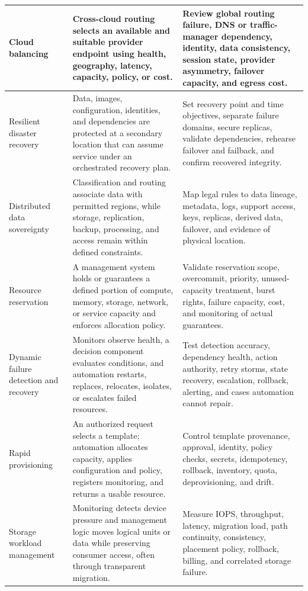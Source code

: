 \documentclass[11pt]{article}
\begin{document}
\begin{longtable}{@{}>{\RaggedRight\arraybackslash}p{}>{\RaggedRight\arraybackslash}p{}>{\RaggedRight\arraybackslash}p{}@{}}
Cloud balancing & Cross-cloud routing selects an available and suitable provider endpoint using health, geography, latency, capacity, policy, or cost. & Review global routing failure, DNS or traffic-manager dependency, identity, data consistency, session state, provider asymmetry, failover capacity, and egress cost. \\\midrule
Resilient disaster recovery & Data, images, configuration, identities, and dependencies are protected at a secondary location that can assume service under an orchestrated recovery plan. & Set recovery point and time objectives, separate failure domains, secure replicas, validate dependencies, rehearse failover and failback, and confirm recovered integrity. \\\midrule
Distributed data sovereignty & Classification and routing associate data with permitted regions, while storage, replication, backup, processing, and access remain within defined constraints. & Map legal rules to data lineage, metadata, logs, support access, keys, replicas, derived data, failover, and evidence of physical location. \\\midrule
Resource reservation & A management system holds or guarantees a defined portion of compute, memory, storage, network, or service capacity and enforces allocation policy. & Validate reservation scope, overcommit, priority, unused-capacity treatment, burst rights, failure capacity, cost, and monitoring of actual guarantees. \\\midrule
Dynamic failure detection and recovery & Monitors observe health, a decision component evaluates conditions, and automation restarts, replaces, relocates, isolates, or escalates failed resources. & Test detection accuracy, dependency health, action authority, retry storms, state recovery, escalation, rollback, alerting, and cases automation cannot repair. \\\midrule
Rapid provisioning & An authorized request selects a template; automation allocates capacity, applies configuration and policy, registers monitoring, and returns a usable resource. & Control template provenance, approval, identity, policy checks, secrets, idempotency, rollback, inventory, quota, deprovisioning, and drift. \\\midrule
Storage workload management & Monitoring detects device pressure and management logic moves logical units or data while preserving consumer access, often through transparent migration. & Measure IOPS, throughput, latency, migration load, path continuity, consistency, placement policy, rollback, billing, and correlated storage failure. \\\midrule

\end{longtable}
\end{document}
